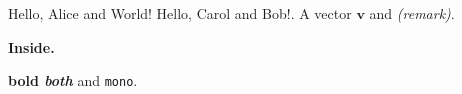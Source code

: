 \documentclass{article}
\newcommand{\vect}[1]{\mathbf{#1}}
\newcommand{\greet}[2][World]{Hello, #2 and #1!}
\newcommand*{\note}[1]{\textit{(#1)}}
\newenvironment{boxed}{\begin{center}\bfseries}{\end{center}}
\begin{document}
\greet{Alice} \greet[Bob]{Carol}.
A vector $\vect{v}$ and \note{remark}.
\begin{boxed}
Inside.
\end{boxed}
\textbf{bold \textit{both}} and \texttt{mono}.
\end{document}
